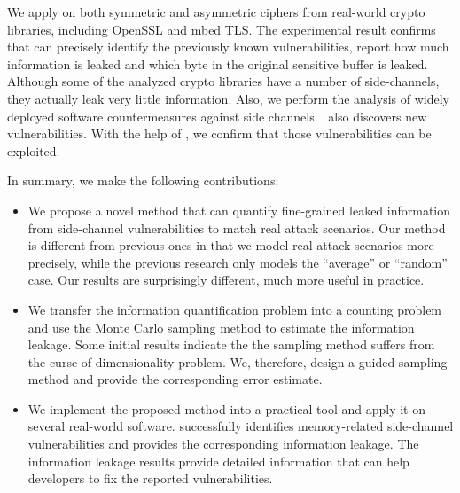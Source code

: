 We apply \tool{} on both symmetric and asymmetric ciphers from real-world crypto
libraries, including OpenSSL and mbed TLS\@. The experimental result confirms
that \tool{} can precisely identify the previously known vulnerabilities, report
how much information is leaked and which byte in the original sensitive buffer
is leaked. Although some of the analyzed crypto libraries have a number of
side-channels, they actually leak very little information. Also, we perform the
analysis of widely deployed software countermeasures against side channels.
\tool\ also discovers new vulnerabilities. With the help of \tool{}, we confirm
that those vulnerabilities can be exploited.

In summary, we make the following contributions:

\begin{itemize}
      \item We propose a novel method that can quantify fine-grained leaked
            information from side-channel vulnerabilities to match real attack
            scenarios.  Our method is different from previous ones in that we
            model real attack scenarios more precisely, while the previous
            research only models the ``average'' or ``random'' case. Our results
            are surprisingly different,
            much more useful in practice.

      \item We transfer the information quantification problem into a counting
            problem and use the Monte Carlo sampling method to estimate the
            information leakage. Some initial results indicate the the sampling
            method suffers from the curse of dimensionality problem. We,
            therefore, design a guided sampling method and provide the
            corresponding error estimate.

      \item We implement the proposed method into a practical tool and apply it
            on several real-world software. \tool{} successfully identifies
            memory-related side-channel vulnerabilities and provides the
            corresponding information leakage. The information leakage results
            provide detailed information that can help developers to fix the
            reported vulnerabilities.
\end{itemize}
